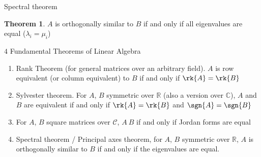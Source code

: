 \documentclass[letterpaper,12pt]{article}
\theoremstyle{definition}
\newtheorem*{theorem}{Theorem}
\begin{document}
Spectral theorem
\begin{theorem}
$A$ is orthogonally similar to $B$ if and only if all eigenvalues are equal ($\lambda_i = \mu_i$)
\end{theorem}

$4$ Fundamental Theorems of Linear Algebra
\begin{enumerate}
    \item Rank Theorem (for general matrices over an arbitrary field). $A$ is row equivalent (or column equivalent) to $B$ if and only if $\rk{A} = \rk{B}$
    \item Sylvester theorem. For $A$, $B$ symmetric over $\mathbb{R}$ (also a version over $\mathbb{C}$), $A$ and $B$ are equivalent if and only if $\rk{A} = \rk{B}$ and $\sgn{A} = \sgn{B}$
    \item For $A$, $B$ square matrices over $\mathcal{C}$, $A ~ B$ if and only if Jordan forms are equal
    \item Spectral theorem / Principal axes theorem, for $A$, $B$ symmetric over $\mathbb{R}$, $A$ is orthogonally similar to $B$ if and only if the eigenvalues are equal.
\end{enumerate}
\end{document}

